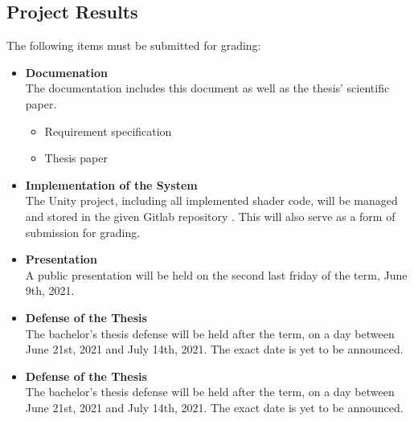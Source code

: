 \subsection{Project Results}
The following items must be submitted for grading:
\begin{itemize}
    \item \textbf{Documenation} \\
    The documentation includes this document as well as the thesis' scientific paper.
    \begin{itemize}
        \item Requirement specification
        \item Thesis paper
    \end{itemize}
    \item \textbf{Implementation of the System} \\
    The Unity project, including all implemented shader code, will be managed and stored in the given Gitlab repository \cite{gitlab}. This will also serve as a form of submission for grading.
    \item \textbf{Presentation} \\
    A public presentation will be held on the second last friday of the term, June 9th, 2021.
    \item \textbf{Defense of the Thesis} \\
    The bachelor's thesis defense will be held after the term, on a day between June 21st, 2021 and July 14th, 2021. The exact date is yet to be announced. 
    \item \textbf{Defense of the Thesis} \\
    The bachelor's thesis defense will be held after the term, on a day between June 21st, 2021 and July 14th, 2021. The exact date is yet to be announced. 
\end{itemize}

